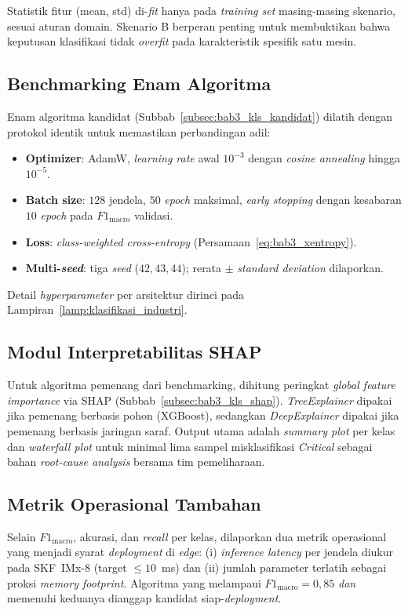 Statistik fitur (mean, std) di-\emph{fit} hanya pada \emph{training set}
masing-masing skenario, sesuai aturan domain. Skenario B berperan
penting untuk membuktikan bahwa keputusan klasifikasi tidak
\emph{overfit} pada karakteristik spesifik satu mesin.

\subsection{Benchmarking Enam Algoritma}
\label{subsec:bab4_benchmarking}

Enam algoritma kandidat (Subbab~\ref{subsec:bab3_kls_kandidat})
dilatih dengan protokol identik untuk memastikan perbandingan adil:

\begin{itemize}
  \item \textbf{Optimizer}: AdamW, \emph{learning rate} awal $10^{-3}$
        dengan \emph{cosine annealing} hingga $10^{-5}$.
  \item \textbf{Batch size}: $128$ jendela, $50$ \emph{epoch} maksimal,
        \emph{early stopping} dengan kesabaran $10$ \emph{epoch} pada
        $F1_{\text{macro}}$ validasi.
  \item \textbf{Loss}: \emph{class-weighted cross-entropy}
        (Persamaan~\ref{eq:bab3_xentropy}).
  \item \textbf{Multi-\emph{seed}}: tiga \emph{seed} ($42, 43, 44$);
        rerata $\pm$ \emph{standard deviation} dilaporkan.
\end{itemize}

Detail \emph{hyperparameter} per arsitektur dirinci pada
Lampiran~\ref{lamp:klasifikasi_industri}.

\subsection{Modul Interpretabilitas SHAP}
\label{subsec:bab4_shap_industri}

Untuk algoritma pemenang dari benchmarking, dihitung peringkat
\emph{global feature importance} via SHAP (Subbab~\ref{subsec:bab3_kls_shap}).
\emph{TreeExplainer} dipakai jika pemenang berbasis pohon (XGBoost),
sedangkan \emph{DeepExplainer} dipakai jika pemenang berbasis jaringan
saraf. Output utama adalah \emph{summary plot} per kelas dan
\emph{waterfall plot} untuk minimal lima sampel misklasifikasi
\emph{Critical} sebagai bahan \emph{root-cause analysis} bersama tim
pemeliharaan.

\subsection{Metrik Operasional Tambahan}
\label{subsec:bab4_metrik_operasional}

Selain $F1_{\text{macro}}$, akurasi, dan \emph{recall} per kelas,
dilaporkan dua metrik operasional yang menjadi syarat \emph{deployment}
di \emph{edge}: (i) \emph{inference latency} per jendela diukur pada
SKF~IMx-8 (target $\leq 10$~ms) dan (ii) jumlah parameter terlatih
sebagai proksi \emph{memory footprint}. Algoritma yang melampaui
$F1_{\text{macro}} = 0{,}85$ \emph{dan} memenuhi keduanya dianggap
kandidat siap-\emph{deployment}.

